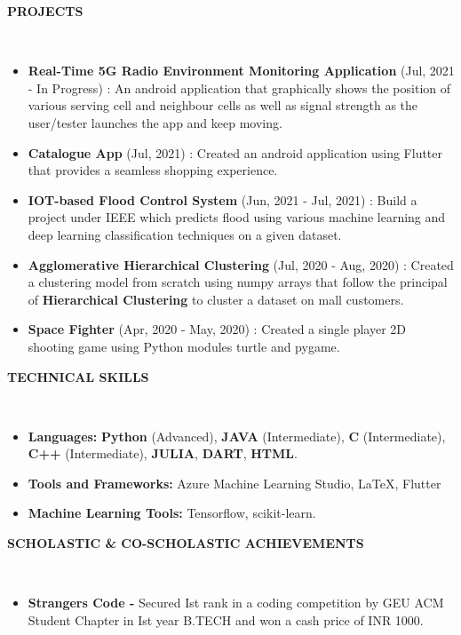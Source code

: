 \documentclass[a4paper,10pt]{article}
\newcommand{\lsep}{-0.5cm}
\newcommand{\resheading}[1]{{\small \colorbox{mygrey}{\begin{minipage}{0.975\textwidth}{\textbf{#1 \vphantom{p\^{E}}}}\end{minipage}}}}
\begin{document}
\resheading{\textbf{PROJECTS} }\\[\lsep]
\begin{itemize}
\setlength\itemsep{0.5em}
\item \textbf{Real-Time 5G Radio Environment Monitoring Application} (Jul, 2021 - In Progress) : An android application that graphically shows the position of various serving cell and neighbour cells as well as signal strength as the user/tester launches the app and keep moving.
\item \textbf{Catalogue App} (Jul, 2021) : Created an android application using Flutter that provides a seamless shopping experience.
\item \textbf{IOT-based Flood Control System} (Jun, 2021 - Jul, 2021) : Build a project under IEEE which predicts flood using various machine learning and deep learning classification techniques on a given dataset.
\item \textbf{Agglomerative Hierarchical Clustering} (Jul, 2020 - Aug, 2020) : Created a clustering model from scratch using numpy arrays that follow the principal of \textbf{Hierarchical Clustering} to cluster a dataset on mall customers.
\item \textbf{Space Fighter} (Apr, 2020 - May, 2020) : Created a single player 2D shooting game using Python modules turtle and pygame.
\end{itemize}

\resheading{\textbf{TECHNICAL SKILLS} }\\[\lsep]
\begin{itemize}
\setlength\itemsep{0em}
\item \noindent \textbf{Languages:} \textbf{Python} (Advanced), \textbf{JAVA} (Intermediate), \textbf{C} (Intermediate), \textbf{C++} (Intermediate), \textbf{JULIA}, \textbf{DART}, \textbf{HTML}.\\
 \item \noindent\textbf{Tools and Frameworks:} Azure Machine Learning Studio, \LaTeX, Flutter\\
\item \noindent \textbf{Machine Learning Tools:} Tensorflow, scikit-learn.
\end{itemize}

\resheading{\textbf{SCHOLASTIC \& CO-SCHOLASTIC ACHIEVEMENTS} }\\[\lsep]
\begin{itemize}
\setlength\itemsep{0em}
\item \noindent\textbf{Strangers Code - }Secured Ist rank in a coding competition by GEU ACM Student Chapter in Ist year B.TECH and won a cash price of INR 1000.
\end{itemize}
\end{document}
